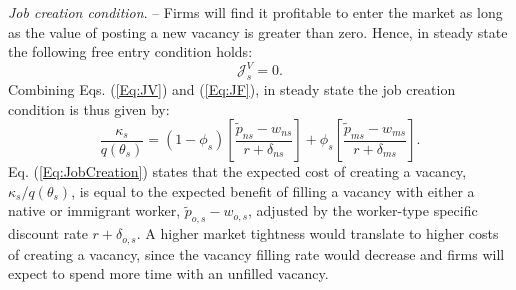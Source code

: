 \documentclass[a4paper,12pt]{article}
\begin{document}
\emph{Job creation condition}. --
Firms will find it profitable to enter the market as long as the value of
posting a new vacancy is greater than zero. Hence, in steady state the
following free entry condition holds: 
\begin{equation}
\mathcal{J}_{s}^{V}=0.  \label{Eq:FreeEntry}
\end{equation}%
Combining Eqs. (\ref{Eq:JV}) and (\ref{Eq:JF}), in steady state the job
creation condition is thus given by:
\begin{equation}
\frac{\kappa _{s}}{q\left( \theta _{s}\right) }=\left( 1-\phi _{s}\right) %
\left[ \frac{\widetilde{p}_{ns}-w_{ns}}{r+\delta _{ns}}\right] +\phi _{s}\left[ 
\frac{\widetilde{p}_{ms}-w_{ms}}{r+\delta _{ms}}\right] .
\label{Eq:JobCreation}
\end{equation}%
Eq. (\ref{Eq:JobCreation}) states that the expected cost of creating a
vacancy, $\kappa _{s}/q\left( \theta _{s}\right) $, is equal to the expected
benefit of filling a vacancy with either a native or immigrant worker, $%
\widetilde{p}_{o,s}-w_{o,s}$, adjusted by the worker-type specific discount rate $%
r+\delta _{o,s}$. A higher market tightness would translate to higher costs
of creating a vacancy, since the vacancy filling rate would decrease and
firms will expect to spend more time with an unfilled vacancy.
\end{document}
